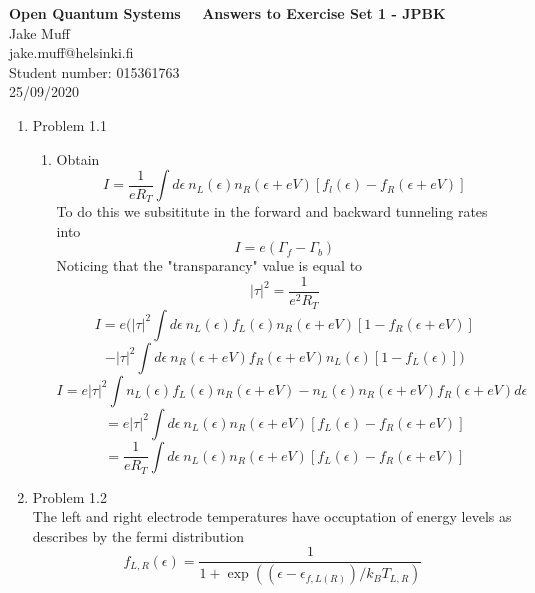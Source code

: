 \documentclass[12pt]{article}
\begin{document}
\normalsize

\baselineskip 14pt

\begin{center}
{\Large {\bf Open Quantum Systems \ \  Answers to Exercise Set 1 - JPBK }}\\
{\large { Jake Muff}}\\
jake.muff@helsinki.fi \\
{Student number: 015361763}\\
{25/09/2020}
\end{center}



\begin{enumerate}

\item Problem 1.1
\begin{enumerate}
    \item Obtain 
    $$ I = \frac{1}{eR_T} \int d \epsilon \ n_L (\epsilon) n_R (\epsilon + eV)[f_l (\epsilon) - f_R (\epsilon + eV)]$$
    To do this we subsititute in the forward and backward tunneling rates into 
    \begin{equation} \label{19}
        I = e(\Gamma_f - \Gamma_b) 
    \end{equation}
    Noticing that the "transparancy" value is equal\cite{1} to 
    $$ |\tau | ^2 = \frac{1}{e^2 R_T} $$
    $$ I = e(|\tau|^2 \int d \epsilon \ n_L (\epsilon) f_L (\epsilon) n_R(\epsilon +eV)[1-f_R (\epsilon +eV)] $$
    $$ - |\tau |^2 \int d \epsilon \ n_R (\epsilon +eV) f_R (\epsilon +eV) n_L (\epsilon) [1-f_L (\epsilon)] ) $$ 
    $$ I = e |\tau|^2 \int n_L (\epsilon) f_L(\epsilon) n_R(\epsilon + eV) - n_L(\epsilon) n_R (\epsilon + eV) f_R(\epsilon + eV) d \epsilon $$
    $$ = e |\tau | ^2 \int d \epsilon \ n_L(\epsilon) n_R(\epsilon +eV)[f_L (\epsilon) - f_R (\epsilon + eV)] $$
    $$ = \frac{1}{eR_T} \int d \epsilon \ n_L(\epsilon) n_R(\epsilon +eV)[f_L (\epsilon) - f_R (\epsilon + eV)] $$

    

    
\end{enumerate}

\item Problem 1.2 \\
The left and right electrode temperatures have occuptation of energy levels as describes by the fermi distribution 
\begin{equation}
    f_{L,R} (\epsilon) = \frac{1}{1+ \exp ((\epsilon - \epsilon_{f,L(R)} ) / k_B T_{L,R}) } 
\end{equation}   


\end{enumerate}
\end{document}
